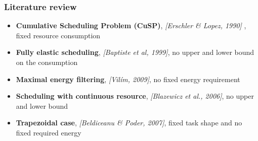 \begin{frame}
  \frametitle{Literature review}
  \begin{itemize}
    \vfill
  \item {\bf Cumulative Scheduling Problem (CuSP)}, {\color{gray!50!black!50} \it [Erschler \& Lopez, 1990] },{\color{blue!80!black!80} fixed resource consumption}
    \vfill
  \item {\bf Fully elastic scheduling}, {\color{gray!50!black!50} \it [Baptiste et al, 1999]}, {\color{blue!80!black!80} no upper and lower bound on the consumption}
    \vfill
  \item {\bf Maximal energy filtering}, {\color{gray!50!black!50} \it [Vil\'im, 2009]}, {\color{blue!80!black!80} no fixed energy requirement}
    \vfill  
  \item {\bf Scheduling with continuous resource}, {\color{gray!50!black!50}\it [Blazewicz et al., 2006]}, {\color{blue!80!black!80}  no upper and lower bound}
    \vfill
  \item {\bf Trapezoidal case}, {\color{gray!50!black!50}\it [Beldiceanu \& Poder, 2007]},
    {\color{blue!80!black!80} fixed task shape and no fixed required energy}
  \end{itemize}
  \vfill
\end{frame}

  

  

